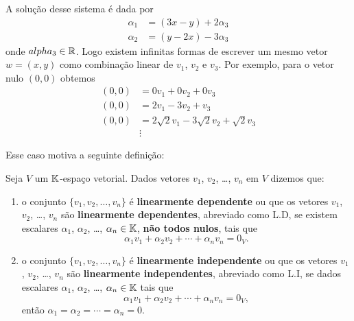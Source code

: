 A solução desse sistema é dada por
\begin{align*}
  \alpha_1 &= (3x - y) + 2\alpha_3\\
  \alpha_2 &= (y - 2x) - 3\alpha_3
\end{align*}
onde $alpha_3 \in \mathbb{R}$. Logo existem infinitas formas de escrever um mesmo vetor $w = (x, y)$ como
combinação linear de $v_1$, $v_2$ e $v_3$. Por exemplo, para o vetor nulo $(0, 0)$ obtemos
\begin{align*}
  (0, 0) &= 0v_1 + 0v_2 + 0v_3\\
  (0, 0) &= 2v_1 - 3v_2 + v_3\\
  (0, 0) &= 2\sqrt{2}v_1 - 3\sqrt{2}v_2 + \sqrt{2}v_3\\
         &\vdots
\end{align*}

Esse caso motiva a seguinte definição:
\begin{definicao}
  Seja $V$ um $\mathbb{K}$-espaço vetorial. Dados vetores $v_1$, $v_2$, \dots, $v_n$ em $V$ dizemos que:
  \begin{enumerate}[label={\roman*})]
    \item o conjunto $\{v_1, v_2, \dots, v_n\}$ é \textbf{linearmente dependente} ou que os vetores $v_1$, $v_2$, \dots, $v_n$ 
      são \textbf{linearmente dependentes}, abreviado como L.D, se existem escalares
      $\alpha_1$, $\alpha_2$, \dots, $\alpha_n \in \mathbb{K}$, \textbf{não todos nulos}, tais que
      \[
        \alpha_1v_1 + \alpha_2v_2 + \cdots + \alpha_nv_n = 0_V.
      \]

    \item o conjunto $\{v_1, v_2, \dots, v_n\}$ é \textbf{linearmente independente} ou que os vetores $v_1$, $v_2$, \dots, $v_n$ 
      são \textbf{linearmente independentes}, abreviado como L.I, se dados escalares
      $\alpha_1$, $\alpha_2$, \dots, $\alpha_n \in \mathbb{K}$  tais que
      \[
        \alpha_1v_1 + \alpha_2v_2 + \cdots + \alpha_nv_n = 0_V,
      \]
      então $\alpha_1 = \alpha_2 = \cdots = \alpha_n = 0$.
  \end{enumerate}
\end{definicao}

